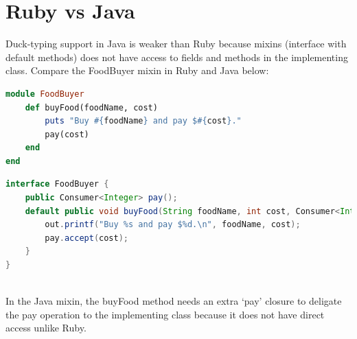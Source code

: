 \documentclass[11pt, a4paper, fleqn, oneside]{article}
\begin{document}
\section{Ruby vs Java}
Duck-typing support in Java is weaker than Ruby because mixins (interface with default methods)
does not have access to fields and methods in the implementing class. Compare the FoodBuyer
mixin in Ruby and Java below:
\begin{lstlisting}[language=Ruby]
module FoodBuyer
    def buyFood(foodName, cost)
        puts "Buy #{foodName} and pay $#{cost}."
        pay(cost)
    end
end
\end{lstlisting}
\begin{lstlisting}[language=Java]
interface FoodBuyer {
    public Consumer<Integer> pay();
    default public void buyFood(String foodName, int cost, Consumer<Integer> pay) {
        out.printf("Buy %s and pay $%d.\n", foodName, cost);
        pay.accept(cost);
    }
}
\end{lstlisting}\\
In the Java mixin, the buyFood method needs an extra `pay' closure to deligate
the pay operation to the implementing class because it does not have direct access unlike Ruby.
\end{document}
